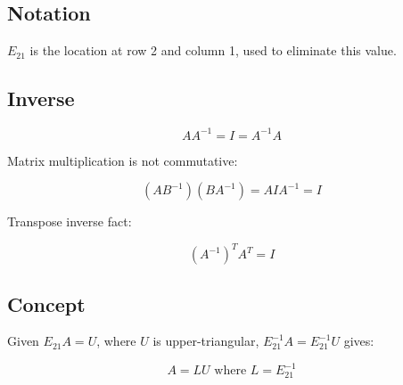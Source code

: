 \subsection{Notation}

$E_{21}$ is the location at row 2 and column 1, used to eliminate this value.

\subsection{Inverse}

\[AA^{-1}=I=A^{-1}A\]

Matrix multiplication is not commutative:

\[\left(A B^{-1}\right)\left(B A^{-1}\right)=A I A^{-1}=I\]

Transpose inverse fact:

\[\boxed{(A^{-1})^TA^T=I}\]

\subsection{Concept}

Given $E_{21}A=U$, where $U$ is upper-triangular, $E^{-1}_{21}A=E^{-1}_{21}U$ gives:

\[\boxed{A=LU\text{ where }L=E^{-1}_{21}}\]